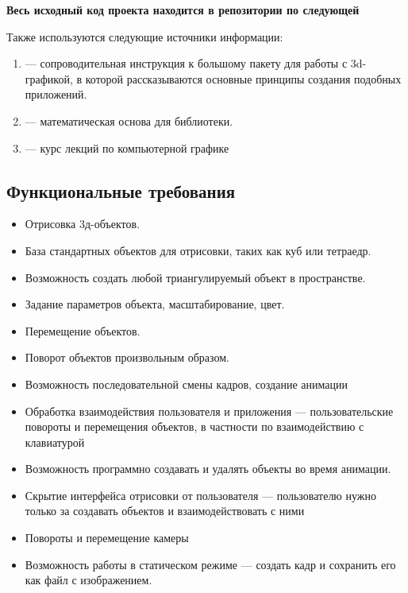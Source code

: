 \documentclass{article}
\begin{document}
\begin{center}\textbf{Весь исходный код проекта находится в репозитории по следующей \href{https://github.com/kik0s/3d-framework}{\color{blue}{ссылке}}} \end{center}

Также используются следующие источники информации:

\begin{enumerate}
\item \cite{vtkBook} --- сопроводительная инструкция к большому пакету для работы с 3d-графикой, в которой рассказываются основные принципы создания подобных приложений.
\item \cite{Math3d} --- математическая основа для библиотеки.
\item \cite{urtech}--- курс лекций по компьютерной графике
\end{enumerate}

\subsection{Функциональные требования}

\begin{itemize}
\item Отрисовка 3д-объектов.
\item База стандартных объектов для отрисовки, таких как куб или тетраедр.
\item Возможность создать любой триангулируемый объект в пространстве.
\item Задание параметров объекта, масштабирование, цвет.
\item Перемещение объектов.
\item Поворот объектов произвольным образом.
\item Возможность последовательной смены кадров, создание анимации
\item Обработка взаимодействия пользователя и приложения — пользовательские повороты и перемещения объектов, в частности по взаимодействию с клавиатурой
\item Возможность программно создавать и удалять объекты во время анимации.
\item Скрытие интерфейса отрисовки от пользователя — пользователю нужно только за создавать объектов и взаимодействовать с ними
\item Повороты и перемещение камеры
\item Возможность работы в статическом режиме — создать кадр и сохранить его как файл с изображением.
\end{itemize}
\end{document}
